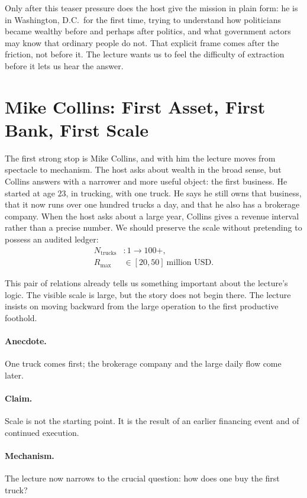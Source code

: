 Only after this teaser pressure does the host give the mission in plain form: he is in Washington, D.C.\ for the first time, trying to understand how politicians became wealthy before and perhaps after politics, and what government actors may know that ordinary people do not. That explicit frame comes after the friction, not before it. The lecture wants us to feel the difficulty of extraction before it lets us hear the answer.

\section{Mike Collins: First Asset, First Bank, First Scale}

The first strong stop is Mike Collins, and with him the lecture moves from spectacle to mechanism. The host asks about wealth in the broad sense, but Collins answers with a narrower and more useful object: the first business. He started at age $23$, in trucking, with one truck. He says he still owns that business, that it now runs over one hundred trucks a day, and that he also has a brokerage company. When the host asks about a large year, Collins gives a revenue interval rather than a precise number. We should preserve the scale without pretending to possess an audited ledger:
\begin{align}
N_{\text{trucks}} &: 1 \to 100+,\\
R_{\max} &\in [20,50]\ \text{million USD}.
\end{align}

This pair of relations already tells us something important about the lecture's logic. The visible scale is large, but the story does not begin there. The lecture insists on moving backward from the large operation to the first productive foothold.

\paragraph{Anecdote.} One truck comes first; the brokerage company and the large daily flow come later.

\paragraph{Claim.} Scale is not the starting point. It is the result of an earlier financing event and of continued execution.

\paragraph{Mechanism.} The lecture now narrows to the crucial question: how does one buy the first truck?

